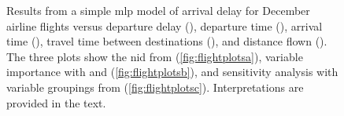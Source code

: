 \documentclass[article]{jss}
\begin{document}
\begin{figure}[t!]
\centering
{}


\caption{Results from a simple \ac{mlp} model of arrival delay for December airline flights versus departure delay (), departure time (), arrival time (), travel time between destinations (), and distance flown (). The three plots show the \ac{nid} from  (\ref{fig:flightplotsa}), variable importance with  and  (\ref{fig:flightplotsb}), and sensitivity analysis with variable groupings from  (\ref{fig:flightplotsc}). Interpretations are provided in the text.}
\label{fig:flightplots}
\end{figure}
\end{document}
